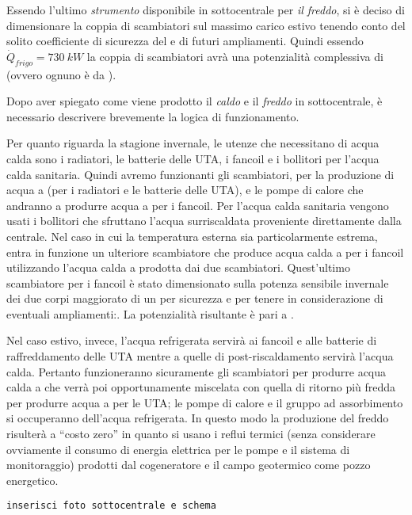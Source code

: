 Essendo l'ultimo \emph{strumento} disponibile in sottocentrale per \emph{il freddo}, si è deciso di dimensionare la coppia di scambiatori sul massimo carico estivo tenendo conto del solito coefficiente di sicurezza del  e di futuri ampliamenti. Quindi essendo $\dot{Q}_{frigo}= \SI{730}{kW}$ la coppia di scambiatori avrà una potenzialità complessiva di  (ovvero ognuno è da ).

\vspace{1em}

Dopo aver spiegato come viene prodotto il \emph{caldo} e il \emph{freddo} in sottocentrale, è necessario descrivere brevemente la logica di funzionamento.

Per quanto riguarda la stagione invernale, le utenze che necessitano di acqua calda sono i radiatori, le batterie delle UTA, i fancoil e i bollitori per l'acqua calda sanitaria. Quindi avremo funzionanti gli scambiatori, per la produzione di acqua a  (per i radiatori e le batterie delle UTA), e le pompe di calore che andranno a produrre acqua a  per i fancoil. Per l'acqua calda sanitaria vengono usati i bollitori che sfruttano l'acqua surriscaldata proveniente direttamente dalla centrale. Nel caso in cui la temperatura esterna sia particolarmente estrema, entra in funzione un ulteriore scambiatore che produce acqua calda a  per i fancoil utilizzando l'acqua calda a  prodotta dai due scambiatori. Quest'ultimo scambiatore per i fancoil è stato dimensionato sulla potenza sensibile invernale dei due corpi maggiorato di un  per sicurezza e per tenere in considerazione di eventuali ampliamenti:. La potenzialità risultante è pari a . 

Nel caso estivo, invece, l'acqua refrigerata servirà ai fancoil e alle batterie di raffreddamento delle UTA mentre a quelle di post-riscaldamento servirà l'acqua calda. Pertanto funzioneranno sicuramente gli scambiatori per produrre acqua calda a  che verrà poi opportunamente miscelata con quella di ritorno più fredda per produrre acqua a  per le UTA; le pompe di calore e il gruppo ad assorbimento si occuperanno dell'acqua refrigerata. In questo modo la produzione del freddo risulterà a ``costo zero'' in quanto si usano i reflui termici (senza considerare ovviamente il consumo di energia elettrica per le pompe e il sistema di monitoraggio) prodotti dal cogeneratore e il campo geotermico come pozzo energetico.

\texttt{inserisci foto sottocentrale e schema}
